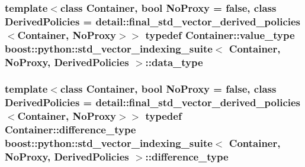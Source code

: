 \subsubsection[{\texorpdfstring{data\+\_\+type}{data_type}}]{\setlength{\rightskip}{0pt plus 5cm}template$<$class Container, bool No\+Proxy = false, class Derived\+Policies = detail\+::final\+\_\+std\+\_\+vector\+\_\+derived\+\_\+policies$<$\+Container, No\+Proxy$>$$>$ typedef Container\+::value\+\_\+type {\bf boost\+::python\+::std\+\_\+vector\+\_\+indexing\+\_\+suite}$<$ Container, No\+Proxy, Derived\+Policies $>$\+::{\bf data\+\_\+type}}\hypertarget{classboost_1_1python_1_1std__vector__indexing__suite_a9c3db9df25d6966c54154275377c94ce}{}\label{classboost_1_1python_1_1std__vector__indexing__suite_a9c3db9df25d6966c54154275377c94ce}
\subsubsection[{\texorpdfstring{difference\+\_\+type}{difference_type}}]{\setlength{\rightskip}{0pt plus 5cm}template$<$class Container, bool No\+Proxy = false, class Derived\+Policies = detail\+::final\+\_\+std\+\_\+vector\+\_\+derived\+\_\+policies$<$\+Container, No\+Proxy$>$$>$ typedef Container\+::difference\+\_\+type {\bf boost\+::python\+::std\+\_\+vector\+\_\+indexing\+\_\+suite}$<$ Container, No\+Proxy, Derived\+Policies $>$\+::{\bf difference\+\_\+type}}\hypertarget{classboost_1_1python_1_1std__vector__indexing__suite_a546a5483c04385c153a5987f5ba16709}{}\label{classboost_1_1python_1_1std__vector__indexing__suite_a546a5483c04385c153a5987f5ba16709}
